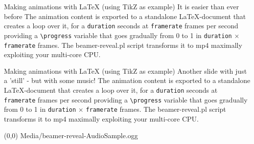 \documentclass[11pt,aspectratio=1610,t]{beamer}%
\begin{document}
{%
}

\begin{frame}
  {Making animations with LaTeX (using TikZ as example)}
  {It is easier than ever before}
  \small The animation content is exported to a standalone \LaTeX-document that creates a
  loop over it, for a \texttt{duration} seconds at
  \texttt{framerate} frames per second providing a \texttt{\textbackslash{}progress}
  variable that goes gradually from 0 to 1 in \texttt{duration} $\times$
  \texttt{framerate} frames. The beamer-reveal.pl script transforms it
  to mp4 maximally exploiting your multi-core CPU.

  \begin{center}
  \end{center}
\end{frame}

\begin{frame}
  {Making animations with LaTeX (using TikZ as example)}
  {Another slide with just a 'still' - but with some music!}
  \small The animation content is exported to a standalone \LaTeX-document that creates a
  loop over it, for a \texttt{duration} seconds at
  \texttt{framerate} frames per second providing a \texttt{\textbackslash{}progress}
  variable that goes gradually from 0 to 1 in \texttt{duration} $\times$
  \texttt{framerate} frames. The beamer-reveal.pl script transforms it
  to mp4 maximally exploiting your multi-core CPU.

  \begin{center}
    \still[progress=0.75,expand once] {\myanimation}
  \end{center}
  \audio[width=0.1,aspectratio=16/9,fit=cover,autoplay] \at (0,0)
        {Media/beamer-reveal-AudioSample.ogg}
\end{frame}
\end{document}
